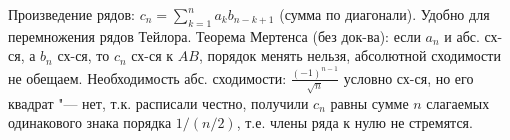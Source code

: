 Произведение рядов: $c_n = \sum_{k=1}^n a_k b_{n-k+1}$ (сумма по диагонали).
Удобно для перемножения рядов Тейлора.
Теорема Мертенса (без док-ва): если $a_n$ и абс. сх-ся, а $b_n$ сх-ся, то $c_n$ сх-ся к $AB$, порядок менять нельзя, абсолютной сходимости не обещаем.
Необходимость абс. сходимости: $\frac{(-1)^{n-1}}{\sqrt n}$ условно сх-ся, но его квадрат "--- нет, т.к. расписали честно, получили $c_n$ равны сумме $n$ слагаемых одинакового знака
порядка $1/(n/2)$, т.е. члены ряда к нулю не стремятся.
